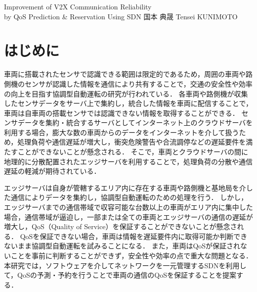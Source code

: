 \documentclass[a4paper,10pt,twocolumn,uplatex]{jsarticle}
\date{11}
\begin{document}
{Improvement of V2X Communication Reliability\\by QoS Prediction \& Reservation Using SDN}
{国本 典晟}
{Tensei KUNIMOTO}

\section{はじめに}
車両に搭載されたセンサで認識できる範囲は限定的であるため，周囲の車両や路側機のセンサが認識した情報を通信により共有することで，交通の安全性や効率の向上を目指す協調型自動運転の研究が行われている\cite{Cooperative}．
各車両や路側機が収集したセンサデータをサーバ上で集約し，統合した情報を車両に配信することで，車両は自車両の搭載センサでは認識できない情報を取得することができる．
センサデータを集約・統合するサーバとしてインターネット上のクラウドサーバを利用する場合，膨大な数の車両からのデータをインターネットを介して扱うため，処理負荷や通信遅延が増大し，衝突危険警告や合流調停などの遅延要件を満たすことができないことが懸念される．
そこで，車両とクラウドサーバの間に地理的に分散配置されたエッジサーバを利用することで，処理負荷の分散や通信遅延の軽減が期待されている\cite{MEC}．\par
エッジサーバは自身が管轄するエリア内に存在する車両や路側機と基地局を介した通信によりデータを集約し，協調型自動運転のための処理を行う．
しかし，エッジサーバまでの通信帯域で収容可能な台数以上の車両がエリア内に集中した場合，通信帯域が逼迫し，一部または全ての車両とエッジサーバの通信の遅延が増大し，QoS（Quality of Service）を保証することができないことが懸念される\cite{QoS}．
QoSを保証できない場合，車両は情報を遅延要件内に取得可能か判断できないまま協調型自動運転を試みることになる．
また，車両はQoSが保証されないことを事前に判断することができず，安全性や効率の点で重大な問題となる．
本研究では，ソフトウェアを介してネットワークを一元管理するSDNを利用して，QoSの予測・予約を行うことで車両の通信のQoSを保証することを提案する．
\end{document}
